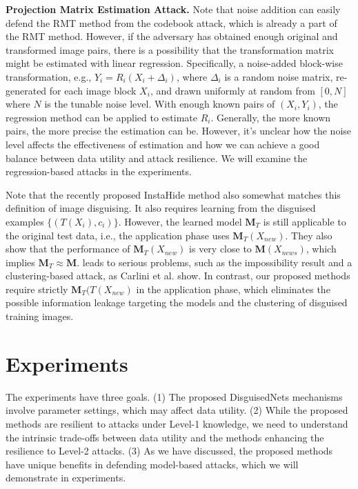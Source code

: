 \documentclass[conference]{IEEEtran}
\begin{document}
\textbf{Projection Matrix Estimation Attack.} Note that noise addition can easily defend the RMT method from the codebook attack, which is already a part of the RMT method. However, if the adversary has obtained enough original and transformed image pairs, there is a possibility that the transformation matrix might be estimated with linear regression.     
Specifically, a noise-added block-wise transformation, e.g., $Y_i = R_i(X_i + \Delta_i)$, where $\Delta_i$ is a random noise matrix, re-generated for each image block $X_i$, and drawn uniformly at random from $[0, N]$ where $N$ is the tunable noise level. With enough known pairs of $(X_i, Y_i)$, the regression method can be applied to estimate $R_i$. Generally, the more known pairs, the more precise the estimation can be. However, it's unclear how the noise level affects the effectiveness of estimation and how we can achieve a good balance between data utility and attack resilience. We will examine the regression-based attacks in the experiments.


Note that the recently proposed InstaHide \cite{huang20} method also somewhat matches this definition of image disguising. It also requires learning from the disguised examples $\{(T(X_i), c_i)\}$. However, the learned model $\mathbf{M}_T$ is still applicable to the original test data, i.e., the application phase uses $\mathbf{M}_T(X_{new})$. They also show that the performance of $\mathbf{M}_T(X_{new})$ is very close to $\mathbf{M}(X_{news})$, which implies $\mathbf{M}_T \approx \mathbf{M}$. leads to serious problems, such as the impossibility result and a clustering-based attack, as Carlini et al. \cite{carlini21} show. In contrast, our proposed methods require strictly $\mathbf{M}_T(T(X_{new})$ in the application phase, which eliminates the possible information leakage targeting the models and the clustering of disguised training images.  


\section{Experiments}\label{sec:experim}
The experiments have three goals. (1) The proposed DisguisedNets mechanisms involve parameter settings, which may affect data utility. (2) While the proposed methods are resilient to attacks under Level-1 knowledge, we need to understand the intrinsic trade-offs between data utility and the methods enhancing the resilience to Level-2 attacks. (3) As we have discussed, the proposed methods have unique benefits in defending model-based attacks, which we will demonstrate in experiments.
\end{document}
